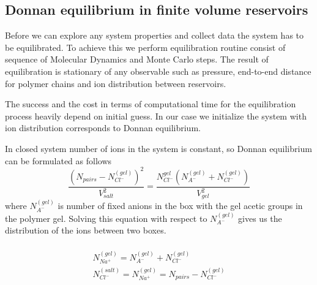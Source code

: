 \subsection{Donnan equilibrium in finite volume reservoirs}
Before we can explore any system properties and collect data the system has to be equilibrated. To achieve this we perform equilibration routine consist of sequence of Molecular Dynamics and Monte Carlo steps.
The result of equilibration is stationary of any observable such as pressure, end-to-end distance for polymer chains and ion distribution between reservoirs. 

The success and the cost in terms of computational time for the equilibration process heavily depend on initial guess. In our case we initialize the system with ion distribution corresponds to Donnan equilibrium.

In closed system number of ions in the system is constant, so Donnan equilibrium can be formulated as follows
\begin{equation}
    \frac{\left(N_{pairs} - N_{Cl^{-}}^{(gel)}\right)^2}{V_{salt}^2} = \frac{N_{Cl^{-}}^{gel} (N^{{(gel)}}_{A^{-}} + N_{Cl^{-}}^{(gel)})}{V_{gel}^2}
\end{equation}
where $N^{{(gel)}}_{A^{-}}$ is number of fixed anions in the box with the gel \ie acetic groups in the polymer gel.
Solving this equation with respect to $N^{{(gel)}}_{A^{-}}$ gives us the distribution of the ions between two boxes.

\begin{eqnarray}
    \\
    N_{Na^{+}}^{(gel)} = N^{{(gel)}}_{A^{-}} + N_{Cl^{-}}^{(gel)}
    \\
    N_{Cl^{-}}^{(salt)} = N_{Na^{+}}^{(gel)} = N_{pairs} - N_{Cl^{-}}^{(gel)}
\end{eqnarray}